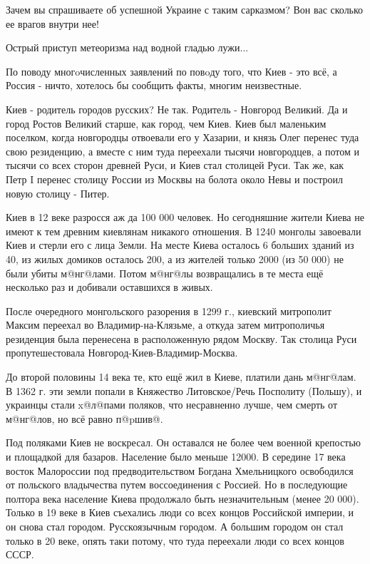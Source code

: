 \begin{itemize}
Зачем вы спрашиваете об успешной Украине с таким сарказмом? Вон вас сколько ее врагов внутри нее!

 
Острый приступ метеоризма над водной гладью лужи...

 
По поводу многoчисленных заявлений по повoду того, что Киев - это всё, а Россия
- ничто, хотелось бы сообщить факты, многим неизвестные.

Киев - родитель городов русских? Не так. Родитель - Новгород Великий. Да и
город Ростов Великий старше, как город, чем Киев. Киев был маленьким поселком,
когда новгородцы отвоевали его у Хазарии, и князь Олег перенес туда свою
резиденцию, а вместе с ним туда переехали тысячи новгородцев, а потом и тысячи
со всех сторон древней Руси, и Киев стал столицей Руси. Так же, как Петр I
перенес столицу России из Москвы на болота около Невы и построил новую столицу
- Питер.

Киев в 12 веке разросся аж да 100 000 человек. Но сегодняшние жители Киева не
имеют к тем древним киевлянам никакого отношения. В 1240 монголы завоевали Киев
и стерли его с лица Земли. На месте Киева осталось 6 больших зданий из 40, из
жилых домиков осталось 200, а из жителей только 2000 (из 50 000) не были убиты
м@нг@лами. Потом м@нг@лы возвращались в те места ещё несколько раз и добивали
оставшихся в живых.

После очередного монгольского разорения в 1299 г., киевский митрополит Максим
переехал во Владимир-на-Клязьме, а откуда затем митрополичья резиденция была
перенесена в расположенную рядом Москву. Так столица Руси пропутешестовала
Новгород-Киев-Владимир-Москва.

До второй половины 14 века те, кто ещё жил в Киеве, платили дань м@нг@лам. В
1362 г. эти земли попали в Княжество Литовское/Речь Посполиту (Польшу), и
украинцы стали x@л@пами поляков, что несравненно лучше, чем смерть от м@нг@лов,
но всё равно п@pшив@.

Под поляками Киев не воскресал. Он оставался не более чем военной крепостью и
площадкой для базаров. Население было меньше 12000. В середине 17 века восток
Малороссии под предводительством Богдана Хмельницкого освободился от польского
владычества путем воссоединения с Россией. Но в последующие полтора века
население Киева продолжало быть незначительным (менее 20 000). Только в 19 веке
в Киев съехались люди со всех концов Российской империи, и он снова стал
городом. Русскоязычным городом. А большим городом он стал только в 20 веке,
опять таки потому, что туда переехали люди со всех концов СССР.


\end{itemize}
